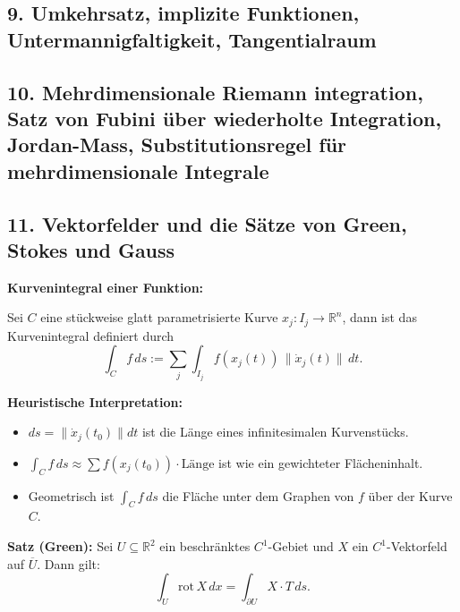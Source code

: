 \subsection{9. Umkehrsatz, implizite Funktionen, Untermannigfaltigkeit, Tangentialraum}

\subsection{10. Mehrdimensionale Riemann integration, Satz von Fubini über wiederholte Integration, Jordan-Mass, Substitutionsregel für mehrdimensionale Integrale}


\subsection{11. Vektorfelder und die 
Sätze von Green, Stokes und Gauss}

\textbf{Kurvenintegral einer Funktion:}

Sei $C$ eine stückweise glatt parametrisierte Kurve $x_j : I_j \to \mathbb{R}^n$, dann ist das Kurvenintegral definiert durch
\[
\int_C f \, ds := \sum_j \int_{I_j} f(x_j(t)) \, \lVert \dot{x}_j(t) \rVert \, dt.
\]

\textbf{Heuristische Interpretation:}

\begin{itemize}
  \item $ds = \lVert \dot{x}_j(t_0) \rVert dt$ ist die Länge eines infinitesimalen Kurvenstücks.
  \item $\int_C f \, ds \approx \sum f(x_j(t_0)) \cdot \text{Länge}$ ist wie ein gewichteter Flächeninhalt.
  \item Geometrisch ist $\int_C f \, ds$ die Fläche unter dem Graphen von $f$ über der Kurve $C$.
\end{itemize}

\textbf{Satz (Green):}
Sei $U \subseteq \mathbb{R}^2$ ein beschränktes $C^1$-Gebiet und $X$ ein $C^1$-Vektorfeld auf $\overline{U}$. Dann gilt:
\[
\int_U \mathrm{rot}\, X \, dx = \int_{\partial U} X \cdot T \, ds.
\]

